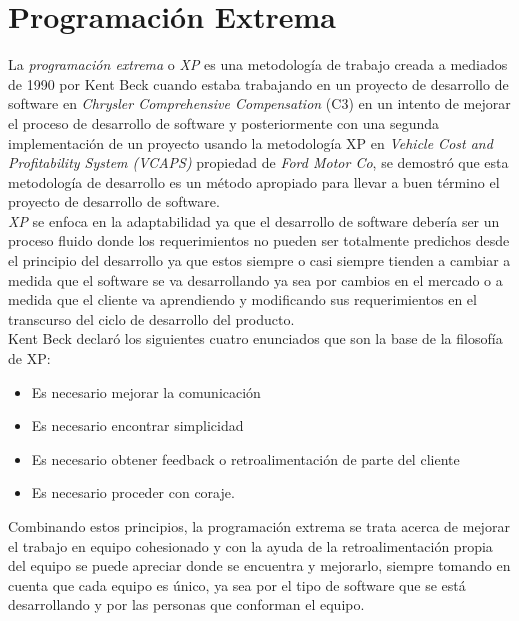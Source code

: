 

   \section{Programación Extrema}
   \label{sec:xp}

     La \emph{programación extrema} o \emph{XP} es una metodología de trabajo creada a mediados de 1990 por Kent Beck cuando estaba trabajando en un proyecto de desarrollo de software en \emph{Chrysler Comprehensive Compensation} (C3) en un intento de mejorar el proceso de desarrollo de software y posteriormente con una segunda implementación de un proyecto usando la metodología XP en \emph{Vehicle Cost and Profitability System (VCAPS)} propiedad de \emph{Ford Motor Co}, se demostró que esta metodología de desarrollo es un método apropiado para llevar a buen término el proyecto de desarrollo de software. \cite{xp_site}\\

     \emph{XP} se enfoca en la adaptabilidad ya que el desarrollo de software debería ser un proceso fluido donde los requerimientos no pueden ser totalmente predichos desde el principio del desarrollo ya que estos siempre o casi siempre tienden a cambiar a medida que el software se va desarrollando ya sea por cambios en el mercado o a medida que el cliente va aprendiendo y modificando sus requerimientos en el transcurso del ciclo de desarrollo del producto.\\

     Kent Beck declaró los siguientes cuatro enunciados que son la base de la filosofía de XP:\\

     \begin{itemize}
       \item Es necesario mejorar la comunicación
       \item Es necesario encontrar simplicidad
       \item Es necesario obtener feedback o retroalimentación de parte del cliente
       \item Es necesario proceder con coraje.
     \end{itemize}

     Combinando estos principios, la programación extrema se trata acerca de mejorar el trabajo en equipo cohesionado y con la ayuda de la retroalimentación propia del equipo se puede apreciar donde se encuentra y mejorarlo, siempre tomando en cuenta que cada equipo es único, ya sea por el tipo de software que se está desarrollando y por las personas que conforman el equipo.\\

